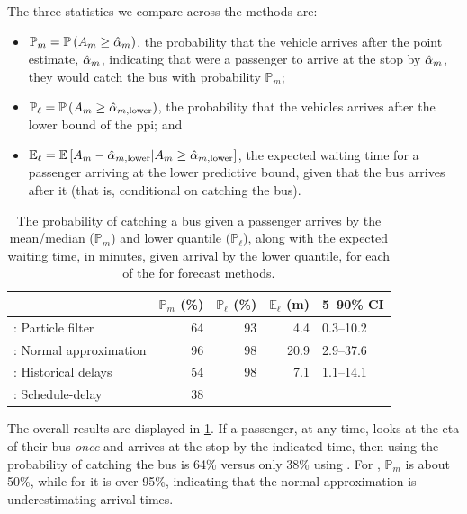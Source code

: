 The three statistics we compare across the methods are:
\begin{itemize}
\item $\mathbb{P}_m = \mathbb{P}\left(A_m \geq \hat{\alpha}_m\right)$, the probability that the vehicle arrives after the point estimate, $\hat{\alpha}_m$, indicating that were a passenger to arrive at the stop by $\hat{\alpha}_m$, they would catch the bus with probability $\mathbb{P}_m$;
\item $\mathbb{P}_\ell = \mathbb{P}\left(A_m \geq \hat\alpha_{m,\text{lower}}\right)$, the probability that the vehicles arrives after the lower bound of the \gls{ppi}; and
\item $\mathbb{E}_\ell = \mathbb{E}\left[A_m - \hat\alpha_{m,\text{lower}} | A_m \geq \hat\alpha_{m,\text{lower}}\right]$, the expected waiting time for a passenger arriving at the lower predictive bound, given that the bus arrives after it (that is, conditional on catching the bus).
\end{itemize}


\begin{knitrout}\small
{}\color{fgcolor}\begin{table}

\caption{\label{tab:model_results_pr_miss}The probability of catching a bus given a passenger arrives by the mean/median ($\mathbb{P}_m$) and lower quantile ($\mathbb{P}_\ell$), along with the expected waiting time, in minutes, given arrival by the lower quantile, for each of the for forecast methods.}
\centering
\fontsize{8}{10}\selectfont
\begin{tabular}[t]{lrrrl}
\toprule
  & $\mathbb{P}_m$ (\%) & $\mathbb{P}_\ell$ (\%) & $\mathbb{E}_\ell$ (m) & 5--90\% CI\\
\midrule
\Fpf{}: Particle filter & 64 & 93 & 4.4 & 0.3--10.2\\
\Fnorm{}: Normal approximation & 96 & 98 & 20.9 & 2.9--37.6\\
\Fhist{}: Historical delays & 54 & 98 & 7.1 & 1.1--14.1\\
\Fsched{}: Schedule-delay & 38 &  &  & \\
\bottomrule
\end{tabular}
\end{table}


\end{knitrout}

The overall results are displayed in \cref{tab:model_results_pr_miss}. If a passenger, at any time, looks at the \gls{eta} of their bus \emph{once} and arrives at the stop by the indicated time, then using \Fpf{} the probability of catching the bus is 64\% versus only 38\% using \Fsched{}. For \Fhist{}, $\mathbb{P}_m$ is about 50\%, while for \Fnorm{} it is over 95\%, indicating that the normal approximation is underestimating arrival times.


